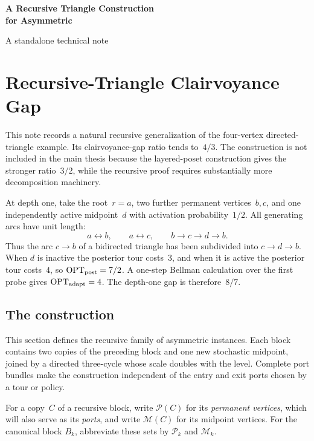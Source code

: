 \documentclass[12pt,a4paper,oneside]{report}
\begin{document}

\begin{titlepage}
\centering
\vspace*{0.18\textheight}
{\LARGE\bfseries A Recursive Triangle Construction\\[0.35em]
for Asymmetric \StochTSP{}\par}
\vspace{1.5em}
{\large A standalone technical note\par}
\vfill
\end{titlepage}

\clearpage
{}
\chapter{Recursive-Triangle Clairvoyance Gap}

This note records a natural recursive generalization of the four-vertex
directed-triangle example.  Its clairvoyance-gap ratio tends to~$4/3$.
The construction is not included in the main thesis because the layered-poset
construction gives the stronger ratio~$3/2$, while the recursive proof
requires substantially more decomposition machinery.

At depth one, take the root~$r=a$, two further permanent vertices~$b,c$, and
one independently active midpoint~$d$ with activation probability~$1/2$.
All generating arcs have unit length:
\[
  a\leftrightarrow b,\qquad
  a\leftrightarrow c,\qquad
  b\to c\to d\to b.
\]
Thus the arc $c\to b$ of a bidirected triangle has been subdivided into
$c\to d\to b$.  When $d$ is inactive the posterior tour costs~$3$, and when
it is active the posterior tour costs~$4$, so $\operatorname{OPT}_\mathrm{post}=7/2$.  A
one-step Bellman calculation over the first probe gives $\operatorname{OPT}_\mathrm{adapt}=4$.
The depth-one gap is therefore~$8/7$.

\section{The construction}\label{sec:recursive-construction}

This section defines the recursive family of asymmetric instances.  Each block
contains two copies of the preceding block and one new stochastic midpoint,
joined by a directed three-cycle whose scale doubles with the level.  Complete
port bundles make the construction independent of the entry and exit ports
chosen by a tour or policy.

For a copy~$C$ of a recursive block, write $\mathcal P(C)$ for its
\emph{permanent vertices}, which will also serve as its \emph{ports}, and
write $\mathcal M(C)$ for its midpoint vertices.  For the canonical block
$B_k$, abbreviate these sets by $\mathcal P_k$ and $\mathcal M_k$.
\end{document}
